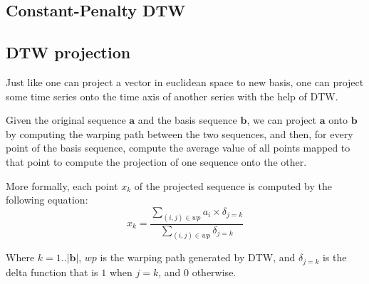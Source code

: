 \documentclass[parskip]{cs4rep}
\begin{document}
\subsection{Constant-Penalty DTW}


\subsection{DTW projection}

\label{sec:dtw-projection}

Just like one can project a vector in euclidean space to new basis, one can project some time series onto the time axis of another series with the help of DTW. 

Given the original sequence $\mathbf{a}$ and the basis sequence $\mathbf{b}$, we can project $\mathbf{a}$ onto $\mathbf{b}$ by computing the warping path between the two sequences, 
and then, for every point of the basis sequence, compute the average value of all points mapped to that point to compute the projection of one sequence onto the other.

More formally, each point $x_k$ of the projected sequence is computed by the following equation:
\begin{equation}
    x_k =  \frac{\sum_{(i,j) \in wp} a_i \times \delta_{j=k}}{\sum_{(i,j) \in wp} \delta_{j=k}} 
\end{equation}

Where $k=1..|\mathbf{b}|$, $wp$ is the warping path generated by DTW, and $\delta_{j=k}$ is the delta function that is $1$ when $j=k$, and $0$ otherwise.
\end{document}
